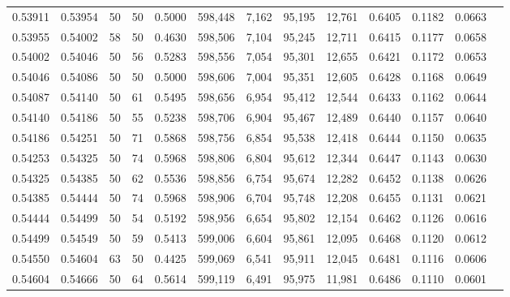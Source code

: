 \begin{tabular}{rrrrrrrrrrrrr}
0.53911 & 0.53954 &    50 &  50 &                                     0.5000 & 598,448 &   7,162 &  95,195 &  12,761 & 0.6405 & 0.1182 & 0.0663 \\
0.53955 & 0.54002 &    58 &  50 &                                     0.4630 & 598,506 &   7,104 &  95,245 &  12,711 & 0.6415 & 0.1177 & 0.0658 \\
0.54002 & 0.54046 &    50 &  56 &                                     0.5283 & 598,556 &   7,054 &  95,301 &  12,655 & 0.6421 & 0.1172 & 0.0653 \\
0.54046 & 0.54086 &    50 &  50 &                                     0.5000 & 598,606 &   7,004 &  95,351 &  12,605 & 0.6428 & 0.1168 & 0.0649 \\
0.54087 & 0.54140 &    50 &  61 &                                     0.5495 & 598,656 &   6,954 &  95,412 &  12,544 & 0.6433 & 0.1162 & 0.0644 \\
0.54140 & 0.54186 &    50 &  55 &                                     0.5238 & 598,706 &   6,904 &  95,467 &  12,489 & 0.6440 & 0.1157 & 0.0640 \\
0.54186 & 0.54251 &    50 &  71 &                                     0.5868 & 598,756 &   6,854 &  95,538 &  12,418 & 0.6444 & 0.1150 & 0.0635 \\
0.54253 & 0.54325 &    50 &  74 &                                     0.5968 & 598,806 &   6,804 &  95,612 &  12,344 & 0.6447 & 0.1143 & 0.0630 \\
0.54325 & 0.54385 &    50 &  62 &                                     0.5536 & 598,856 &   6,754 &  95,674 &  12,282 & 0.6452 & 0.1138 & 0.0626 \\
0.54385 & 0.54444 &    50 &  74 &                                     0.5968 & 598,906 &   6,704 &  95,748 &  12,208 & 0.6455 & 0.1131 & 0.0621 \\
0.54444 & 0.54499 &    50 &  54 &                                     0.5192 & 598,956 &   6,654 &  95,802 &  12,154 & 0.6462 & 0.1126 & 0.0616 \\
0.54499 & 0.54549 &    50 &  59 &                                     0.5413 & 599,006 &   6,604 &  95,861 &  12,095 & 0.6468 & 0.1120 & 0.0612 \\
0.54550 & 0.54604 &    63 &  50 &                                     0.4425 & 599,069 &   6,541 &  95,911 &  12,045 & 0.6481 & 0.1116 & 0.0606 \\
0.54604 & 0.54666 &    50 &  64 &                                     0.5614 & 599,119 &   6,491 &  95,975 &  11,981 & 0.6486 & 0.1110 & 0.0601 \\

\end{tabular}
